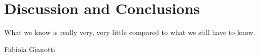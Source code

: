 \chapter{Discussion and Conclusions}
\label{chapter:discussion}

\epigraph{What we know is really very, very little compared to what we still have to know.}{Fabiola Gianotti}



